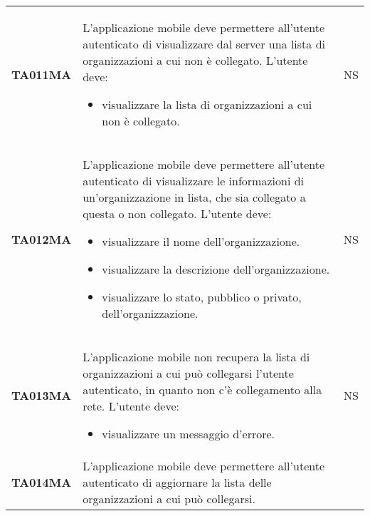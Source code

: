 \documentclass[../../piano-di-qualifica.tex]{subfiles}
\begin{document}
\begin{longtable}[H]{>{\centering\bfseries}m{3cm} >{}m{10cm} >{\centering\arraybackslash}m{3cm}}
  TA011MA           & L'applicazione mobile deve permettere all'utente autenticato di visualizzare dal server una lista di organizzazioni a cui non è collegato. \newline
  L'utente deve:
  \begin{itemize}
    \item visualizzare la lista di organizzazioni a cui non è collegato.
  \end{itemize}
                    & NS                                                                                                                                                                                                                                                               \\
  TA012MA           & L'applicazione mobile deve permettere all'utente autenticato di visualizzare le informazioni di un'organizzazione in lista, che sia collegato a questa o non collegato. \newline
  L'utente deve:
  \begin{itemize}
    \item visualizzare il nome dell'organizzazione.
    \item visualizzare la descrizione dell'organizzazione.
    \item visualizzare lo stato, pubblico o privato, dell'organizzazione.
  \end{itemize}
                    & NS                                                                                                                                                                                                                                                               \\
  TA013MA           & L'applicazione mobile non recupera la lista di organizzazioni a cui può collegarsi l'utente autenticato, in quanto non c'è collegamento alla rete. \newline
  L'utente deve:
  \begin{itemize}
    \item visualizzare un messaggio d'errore.
  \end{itemize}
                    & NS                                                                                                                                                                                                                                                               \\
  TA014MA           & L'applicazione mobile deve permettere all'utente autenticato di aggiornare la lista delle organizzazioni a cui può collegarsi. \newline

\end{longtable}
\end{document}
